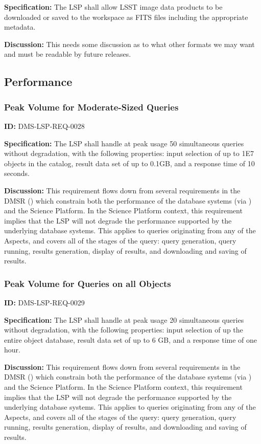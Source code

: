 \documentclass[SE,toc]{lsstdoc}
\begin{document}
\textbf{Specification:}
The LSP shall allow LSST image data products to be downloaded or saved to the workspace as FITS files including the appropriate metadata.

\textbf{Discussion:}
This needs some discussion as to what other formats we may want and must be readable by future releases.

\subsection{Performance}

\subsubsection{Peak Volume for Moderate-Sized Queries}

\label{DMS-LSP-REQ-0028}
\textbf{ID:} DMS-LSP-REQ-0028

\textbf{Specification:}
The LSP shall handle at peak usage 50 simultaneous queries without degradation, with the following properties: input selection of up to 1E7 objects in the catalog, result data set of up to 0.1GB, and a response time of 10 seconds.

\textbf{Discussion:}
This requirement flows down from several requirements in the DMSR () which constrain both the performance of the database systems (via ) and the Science Platform.  In the Science Platform context, this requirement implies that the LSP will not degrade the performance supported by the underlying database systems.  This applies to queries originating from any of the Aspects, and covers all of the stages of the query: query generation, query running, results generation, display of results, and downloading and saving of results.

\subsubsection{Peak Volume for Queries on all Objects}

\label{DMS-LSP-REQ-0029}
\textbf{ID:} DMS-LSP-REQ-0029

\textbf{Specification:}
The LSP shall handle at peak usage 20 simultaneous queries without degradation, with the following properties: input selection of up the entire object database, result data set of up to 6 GB, and a response time of one hour.

\textbf{Discussion:}
This requirement flows down from several requirements in the DMSR () which constrain both the performance of the database systems (via ) and the Science Platform.  In the Science Platform context, this requirement implies that the LSP will not degrade the performance supported by the underlying database systems.  This applies to queries originating from any of the Aspects, and covers all of the stages of the query: query generation, query running, results generation, display of results, and downloading and saving of results.
\end{document}
